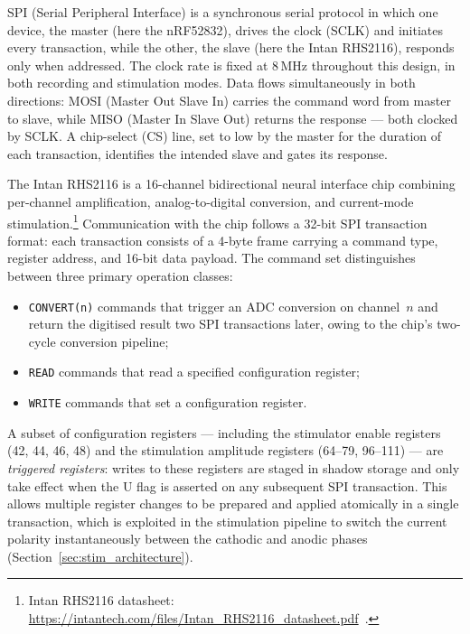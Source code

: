 SPI (Serial Peripheral Interface) is a synchronous serial protocol in which one device,
the master (here the nRF52832), drives the clock (SCLK) and
initiates every transaction, while the other, the slave (here the Intan RHS2116),
responds only when addressed. The clock rate is fixed at 8\,MHz throughout this design,
in both recording and stimulation modes.
Data flows simultaneously in both directions: MOSI (Master Out Slave In) carries the
command word from master to slave, while MISO (Master In Slave Out) returns the
response --- both clocked by SCLK. A chip-select (CS) line, set to low by the master
for the duration of each transaction, identifies the intended slave and gates its
response.

The Intan RHS2116 is a 16-channel bidirectional neural interface chip combining
per-channel amplification, analog-to-digital conversion, and current-mode
stimulation.\footnote{Intan RHS2116 datasheet: \url{https://intantech.com/files/Intan_RHS2116_datasheet.pdf}~\cite{intan_rhs2116_datasheet}.}
Communication with the chip follows a 32-bit SPI transaction format: each transaction
consists of a 4-byte frame carrying a command type, register address, and 16-bit data
payload. The command set distinguishes between three primary operation classes:

\begin{itemize}
    \item \texttt{CONVERT(n)} commands that trigger an ADC conversion on channel~$n$
    and return the digitised result two SPI transactions later, owing to the chip's
    two-cycle conversion pipeline;
    \item \texttt{READ} commands that read a specified configuration register;
    \item \texttt{WRITE} commands that set a configuration register.
\end{itemize}

A subset of configuration registers --- including the stimulator enable registers (42,
44, 46, 48) and the stimulation amplitude registers (64--79, 96--111) --- are
\emph{triggered registers}: writes to these registers are staged in shadow storage and
only take effect when the U flag is asserted on any subsequent SPI transaction. This
allows multiple register changes to be prepared and applied atomically in a single
transaction, which is exploited in the stimulation pipeline to switch the current
polarity instantaneously between the cathodic and anodic phases
(Section~\ref{sec:stim_architecture}).

